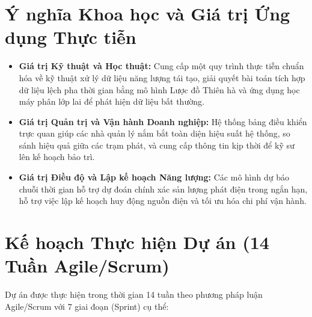 \documentclass[12pt, a4paper]{report}
\begin{document}
\section{Ý nghĩa Khoa học và Giá trị Ứng dụng Thực tiễn}
\label{sec:ynghia}

\begin{itemize}[noitemsep]
    \item \textbf{Giá trị Kỹ thuật và Học thuật:} Cung cấp một quy trình thực tiễn chuẩn hóa về kỹ thuật xử lý dữ liệu năng lượng tái tạo, giải quyết bài toán tích hợp dữ liệu lệch pha thời gian bằng mô hình Lược đồ Thiên hà và ứng dụng học máy phân lớp lai để phát hiện dữ liệu bất thường.
    \item \textbf{Giá trị Quản trị và Vận hành Doanh nghiệp:} Hệ thống bảng điều khiển trực quan giúp các nhà quản lý nắm bắt toàn diện hiệu suất hệ thống, so sánh hiệu quả giữa các trạm phát, và cung cấp thông tin kịp thời để kỹ sư lên kế hoạch bảo trì.
    \item \textbf{Giá trị Điều độ và Lập kế hoạch Năng lượng:} Các mô hình dự báo chuỗi thời gian hỗ trợ dự đoán chính xác sản lượng phát điện trong ngắn hạn, hỗ trợ việc lập kế hoạch huy động nguồn điện và tối ưu hóa chi phí vận hành.
\end{itemize}

\section{Kế hoạch Thực hiện Dự án (14 Tuần Agile/Scrum)}
\label{sec:kehoach}

Dự án được thực hiện trong thời gian 14 tuần theo phương pháp luận Agile/Scrum với 7 giai đoạn (Sprint) cụ thể:
\end{document}
